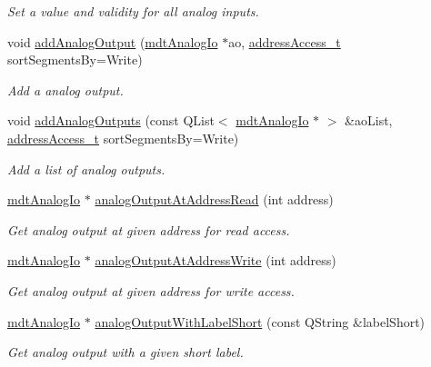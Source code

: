 \begin{DoxyCompactItemize}
\begin{DoxyCompactList}\small\item\em Set a value and validity for all analog inputs. \end{DoxyCompactList}\item 
void \hyperlink{classmdt_device_ios_aa0e736fa9663fa133cbf337d5a4b90e2}{addAnalogOutput} (\hyperlink{classmdt_analog_io}{mdtAnalogIo} $\ast$ao, \hyperlink{classmdt_device_ios_a72fc3fdcd905d669b1e90496e808d6dd}{addressAccess\_\-t} sortSegmentsBy=Write)
\begin{DoxyCompactList}\small\item\em Add a analog output. \end{DoxyCompactList}\item 
void \hyperlink{classmdt_device_ios_acde9cd81580041c5a9bcb5e3f7ee5592}{addAnalogOutputs} (const QList$<$ \hyperlink{classmdt_analog_io}{mdtAnalogIo} $\ast$ $>$ \&aoList, \hyperlink{classmdt_device_ios_a72fc3fdcd905d669b1e90496e808d6dd}{addressAccess\_\-t} sortSegmentsBy=Write)
\begin{DoxyCompactList}\small\item\em Add a list of analog outputs. \end{DoxyCompactList}\item 
\hyperlink{classmdt_analog_io}{mdtAnalogIo} $\ast$ \hyperlink{classmdt_device_ios_a74385f332753cedb68ae4133c97384be}{analogOutputAtAddressRead} (int address)
\begin{DoxyCompactList}\small\item\em Get analog output at given address for read access. \end{DoxyCompactList}\item 
\hyperlink{classmdt_analog_io}{mdtAnalogIo} $\ast$ \hyperlink{classmdt_device_ios_a968999a1021a96504805248e2ce04382}{analogOutputAtAddressWrite} (int address)
\begin{DoxyCompactList}\small\item\em Get analog output at given address for write access. \end{DoxyCompactList}\item 
\hyperlink{classmdt_analog_io}{mdtAnalogIo} $\ast$ \hyperlink{classmdt_device_ios_aab2b2b1f8c887eb9f439cf495ec95fbd}{analogOutputWithLabelShort} (const QString \&labelShort)
\begin{DoxyCompactList}\small\item\em Get analog output with a given short label. \end{DoxyCompactList}\item 

\end{DoxyCompactItemize}
